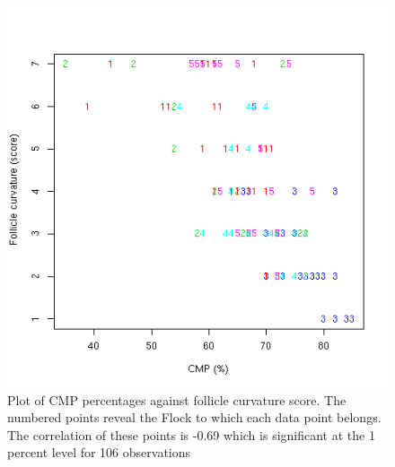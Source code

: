 %

\begin{figure}[!h]
  \centering
  \includegraphics[width=1.0\textwidth]{CMPFc.png}
  \caption{Plot of CMP percentages against follicle curvature score. The numbered points reveal the Flock to which each data point belongs. The correlation of these points is -0.69 which is significant at the 1 percent level for 106 observations}
  \label{fig:CMPFc}
\end{figure}

%

